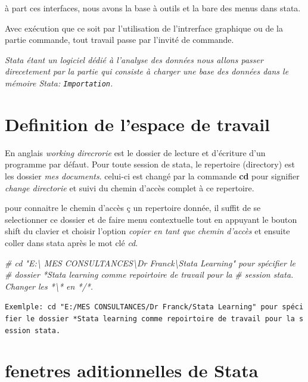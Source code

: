 \documentclass[
]{book}
\newenvironment{Shaded}{\begin{snugshade}}{\end{snugshade}}
\newcommand{\CommentTok}[1]{\textcolor[rgb]{0.56,0.35,0.01}{\textit{#1}}}
\theoremstyle{definition}
\theoremstyle{definition}
\theoremstyle{definition}
\theoremstyle{definition}
\theoremstyle{remark}
\begin{document}
à part ces interfaces, nous avons la base à outils et la bare des menus dans stata.

Avec exécution que ce soit par l'utilisation de l'intrerface graphique ou de la partie commande, tout travail passe par l'invité de commande.

\emph{Stata étant un logiciel dédié à l'analyse des données nous allons passer direcetement par la partie qui consiste à charger une base des données dans le mémoire Stata: \texttt{Importation}.}

\hypertarget{definition-de-lespace-de-travail}{%
\section{Definition de l'espace de travail}\label{definition-de-lespace-de-travail}}

En anglais \emph{working direcrorie} est le dossier de lecture et d'écriture d'un programme par défaut. Pour toute session de stata, le repertoire (directory) est les dossier \emph{mes documents}. celui-ci est changé par la commande \textbf{cd} pour signifier \emph{change directorie} et suivi du chemin d'accès complet à ce repertoire.

pour connaitre le chemin d'accès ç un repertoire donnée, il suffit de se selectionner ce dossier et de faire menu contextuelle tout en appuyant le bouton shift du clavier et choisir l'option \emph{copier en tant que chemin d'accès} et ensuite coller dans stata après le mot clé \emph{cd}.

\begin{Shaded}
\begin{Highlighting}[]
  \CommentTok{\# cd "E:\textbackslash{} MES CONSULTANCES\textbackslash{}Dr Franck\textbackslash{}Stata Learning" pour spécifier le }
  \CommentTok{\#  dossier *Stata learning comme repoirtoire de travail pour la }
  \CommentTok{\# session stata. Changer les *\textbackslash{}* en */*.}
\end{Highlighting}
\end{Shaded}

\texttt{Exemlple:\ cd\ "E:/MES\ CONSULTANCES/Dr\ Franck/Stata\ Learning"\ pour\ spécifier\ le\ dossier\ *Stata\ learning\ comme\ repoirtoire\ de\ travail\ pour\ la\ session\ stata.}

\hypertarget{fenetres-aditionnelles-de-stata}{%
\section{fenetres aditionnelles de Stata}\label{fenetres-aditionnelles-de-stata}}
\end{document}
